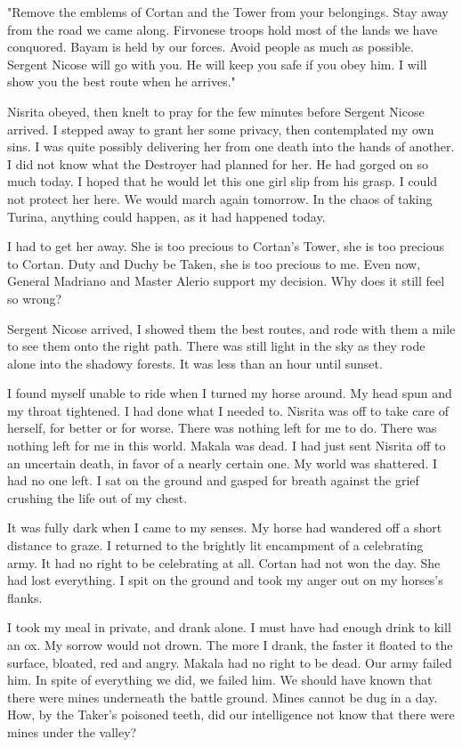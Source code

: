 \documentclass{article}
\begin{document}
"Remove the emblems of Cortan and the Tower from your belongings. Stay away from the road we came along. Firvonese troops hold most of the lands we have conquored. Bayam is held by our forces. Avoid people as much as possible. Sergent Nicose will go with you. He will keep you safe if you obey him. I will show you the best route when he arrives."

Nisrita obeyed, then knelt to pray for the few minutes before Sergent Nicose arrived. I stepped away to grant her some privacy, then contemplated my own sins. I was quite possibly delivering her from one death into the hands of another. I did not know what the Destroyer had planned for her. He had gorged on so much today. I hoped that he would let this one girl slip from his grasp. I could not protect her here. We would march again tomorrow. In the chaos of taking Turina, anything could happen, as it had happened today. 

I had to get her away. She is too precious to Cortan's Tower, she is too precious to Cortan. Duty and Duchy be Taken, she is too precious to me.  Even now, General Madriano and Master Alerio support my decision. Why does it still feel so wrong?

Sergent Nicose arrived, I showed them the best routes, and rode with them a mile to see them onto the right path. There was still light in the sky as they rode alone into the shadowy forests. It was less than an hour until sunset. 

I found myself unable to ride when I turned my horse around. My head spun and my throat tightened. I had done what I needed to. Nisrita was off to take care of herself, for better or for worse. There was nothing left for me to do. There was nothing left for me in this world. Makala was dead. I had just sent Nisrita off to an uncertain death, in favor of a nearly certain one. My world was shattered. I had no one left. I sat on the ground and gasped for breath against the grief crushing the life out of my chest. 

It was fully dark when I came to my senses. My horse had wandered off a short distance to graze. I returned to the brightly lit encampment of a celebrating army. It had no right to be celebrating at all. Cortan had not won the day. She had lost everything. I spit on the ground and took my anger out on my horses's flanks. 

I took my meal in private, and drank alone. I must have had enough drink to kill an ox. My sorrow would not drown. The more I drank, the faster it floated to the surface, bloated, red and angry. Makala had no right to be dead. Our army failed him. In spite of everything we did, we failed him. We should have known that there were mines underneath the battle ground. Mines cannot be dug in a day. How, by the Taker's poisoned teeth, did our intelligence not know that there were mines under the valley?
\end{document}
